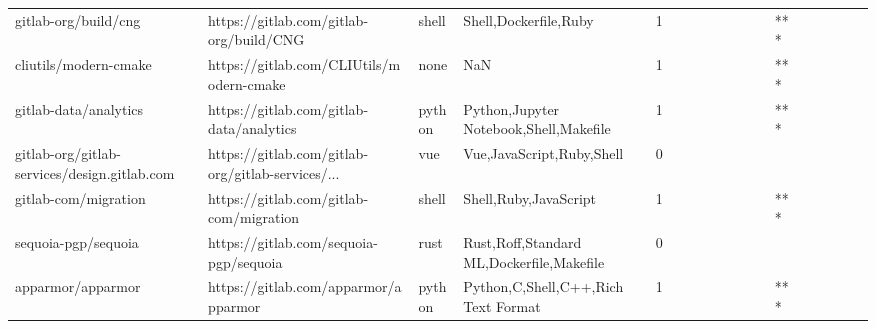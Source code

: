 \begin{tabular}{llllrlllllllllllll}
gitlab-org/build/cng                               &            https://gitlab.com/gitlab-org/build/CNG &             shell &                              Shell,Dockerfile,Ruby &       1 &         &        &           &                &                 &        &           &       *** &          &          &       &              &          \\
cliutils/modern-cmake                              &           https://gitlab.com/CLIUtils/modern-cmake &              none &                                                NaN &       1 &         &        &           &                &                 &        &           &       *** &          &          &       &              &          \\
gitlab-data/analytics                              &           https://gitlab.com/gitlab-data/analytics &            python &             Python,Jupyter Notebook,Shell,Makefile &       1 &         &        &           &                &                 &        &           &       *** &          &          &       &              &          \\
gitlab-org/gitlab-services/design.gitlab.com       &  https://gitlab.com/gitlab-org/gitlab-services/... &               vue &                          Vue,JavaScript,Ruby,Shell &       0 &         &        &           &                &                 &        &           &           &          &          &       &              &          \\
gitlab-com/migration                               &            https://gitlab.com/gitlab-com/migration &             shell &                              Shell,Ruby,JavaScript &       1 &         &        &           &                &                 &        &           &       *** &          &          &       &              &          \\
sequoia-pgp/sequoia                                &             https://gitlab.com/sequoia-pgp/sequoia &              rust &          Rust,Roff,Standard ML,Dockerfile,Makefile &       0 &         &        &           &                &                 &        &           &           &          &          &       &              &          \\
apparmor/apparmor                                  &               https://gitlab.com/apparmor/apparmor &            python &                Python,C,Shell,C++,Rich Text Format &       1 &         &        &           &                &                 &        &           &       *** &          &          &       &              &          \\

\end{tabular}
